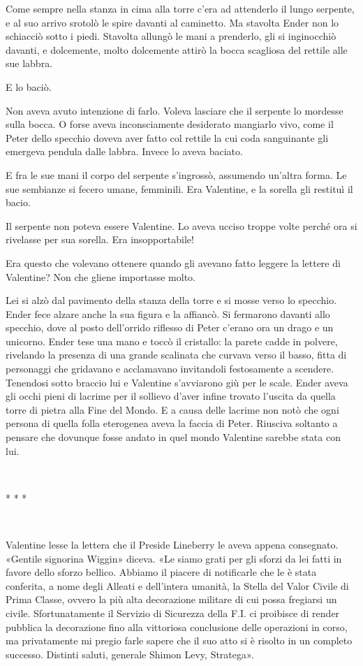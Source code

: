 {Come sempre nella stanza in cima alla torre c'era ad attenderlo il
	lungo serpente, e al suo arrivo srotolò le spire davanti al caminetto.
	Ma stavolta Ender non lo schiacciò sotto i piedi. Stavolta allungò le
	mani a prenderlo, gli si inginocchiò davanti, e dolcemente, molto
	dolcemente attirò la bocca scagliosa del rettile alle sue labbra.}

{E lo baciò.}

{Non aveva avuto intenzione di farlo. Voleva lasciare che il serpente lo
	mordesse sulla bocca. O forse aveva inconsciamente desiderato mangiarlo
	vivo, come il Peter dello specchio doveva aver fatto col rettile la cui
	coda sanguinante gli emergeva pendula dalle labbra. Invece lo aveva
	baciato.}

{E fra le sue mani il corpo del serpente s'ingrossò, assumendo un'altra
	forma. Le sue sembianze si fecero umane, femminili. Era Valentine, e la
	sorella gli restituì il bacio.}

{Il serpente non poteva essere Valentine. Lo aveva ucciso troppe volte
	perché ora si rivelasse per sua sorella. Era insopportabile!}

{Era questo che volevano ottenere quando gli avevano fatto leggere la
	lettere di Valentine? Non che gliene importasse molto.}

{Lei si alzò dal pavimento della stanza della torre e si mosse verso lo
	specchio. Ender fece alzare anche la sua figura e la affiancò. Si
	fermarono davanti allo specchio, dove al posto dell'orrido riflesso di
	Peter c'erano ora un drago e un unicorno. Ender tese una mano e toccò il
	cristallo: la parete cadde in polvere, rivelando la presenza di una
	grande scalinata che curvava verso il basso, fitta di personaggi che
	gridavano e acclamavano invitandoli festosamente a scendere. Tenendosi
	sotto braccio lui e Valentine s'avviarono giù per le scale. Ender aveva
	gli occhi pieni di lacrime per il sollievo d'aver infine trovato
	l'uscita da quella torre di pietra alla Fine del Mondo. E a causa delle
	lacrime non notò che ogni persona di quella folla eterogenea aveva la
	faccia di Peter. Riusciva soltanto a pensare che dovunque fosse andato
	in quel mondo Valentine sarebbe stata con lui.}

{~}

\begin{center}
	{* * *}
\end{center}

{~}

{Valentine lesse la lettera che il Preside Lineberry le aveva appena
	consegnato. «Gentile signorina Wiggin» diceva. «Le siamo grati per gli
	sforzi da lei fatti in favore dello sforzo bellico. Abbiamo il piacere
	di notificarle che le è stata conferita, a nome degli Alleati e
	dell'intera umanità, la Stella del Valor Civile di Prima Classe, ovvero
	la più alta decorazione militare di cui possa fregiarsi un civile.
	Sfortunatamente il Servizio di Sicurezza della F.I. ci proibisce di
	render pubblica la decorazione fino alla vittoriosa conclusione delle
	operazioni in corso, ma privatamente mi pregio farle sapere che il suo
	atto si è risolto in un completo successo. Distinti saluti, generale
	Shimon Levy, Stratega».}

